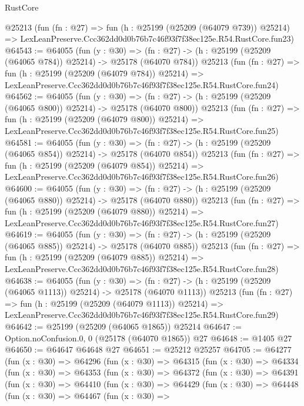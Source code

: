 \begin{lexlean}{RustCore}
\begin{coremodule}
    @25213
    (fun (fn : @27) =>
    fun (h : @25199 (@25209 (@64079 @739)) @25214) =>
    LexLeanPreserve.Ccc362dd0d0b76b7c46f93f7f38ec125e.R54.RustCore.fun23)
@64543 := @64055
    (fun (y : @30) =>
    (fn : @27) -> (h : @25199 (@25209 (@64065 @784)) @25214) -> @25178 (@64070 @784))
    @25213
    (fun (fn : @27) =>
    fun (h : @25199 (@25209 (@64079 @784)) @25214) =>
    LexLeanPreserve.Ccc362dd0d0b76b7c46f93f7f38ec125e.R54.RustCore.fun24)
@64562 := @64055
    (fun (y : @30) =>
    (fn : @27) -> (h : @25199 (@25209 (@64065 @800)) @25214) -> @25178 (@64070 @800))
    @25213
    (fun (fn : @27) =>
    fun (h : @25199 (@25209 (@64079 @800)) @25214) =>
    LexLeanPreserve.Ccc362dd0d0b76b7c46f93f7f38ec125e.R54.RustCore.fun25)
@64581 := @64055
    (fun (y : @30) =>
    (fn : @27) -> (h : @25199 (@25209 (@64065 @854)) @25214) -> @25178 (@64070 @854))
    @25213
    (fun (fn : @27) =>
    fun (h : @25199 (@25209 (@64079 @854)) @25214) =>
    LexLeanPreserve.Ccc362dd0d0b76b7c46f93f7f38ec125e.R54.RustCore.fun26)
@64600 := @64055
    (fun (y : @30) =>
    (fn : @27) -> (h : @25199 (@25209 (@64065 @880)) @25214) -> @25178 (@64070 @880))
    @25213
    (fun (fn : @27) =>
    fun (h : @25199 (@25209 (@64079 @880)) @25214) =>
    LexLeanPreserve.Ccc362dd0d0b76b7c46f93f7f38ec125e.R54.RustCore.fun27)
@64619 := @64055
    (fun (y : @30) =>
    (fn : @27) -> (h : @25199 (@25209 (@64065 @885)) @25214) -> @25178 (@64070 @885))
    @25213
    (fun (fn : @27) =>
    fun (h : @25199 (@25209 (@64079 @885)) @25214) =>
    LexLeanPreserve.Ccc362dd0d0b76b7c46f93f7f38ec125e.R54.RustCore.fun28)
@64638 := @64055
    (fun (y : @30) =>
    (fn : @27) -> (h : @25199 (@25209 (@64065 @1113)) @25214) -> @25178 (@64070 @1113))
    @25213
    (fun (fn : @27) =>
    fun (h : @25199 (@25209 (@64079 @1113)) @25214) =>
    LexLeanPreserve.Ccc362dd0d0b76b7c46f93f7f38ec125e.R54.RustCore.fun29)
@64642 := @25199 (@25209 (@64065 @1865)) @25214
@64647 := Option.noConfusion.{0, 0} (@25178 (@64070 @1865)) @27
@64648 := @1405 @27
@64650 := @64647 @64648 @27
@64651 := @25212 @25257
@64705 := @64277
    (fun (x : @30) =>
    @64296
      (fun (x : @30) =>
      @64315
        (fun (x : @30) =>
        @64334
          (fun (x : @30) =>
          @64353
            (fun (x : @30) =>
            @64372
              (fun (x : @30) =>
              @64391
                (fun (x : @30) =>
                @64410
                  (fun (x : @30) =>
                  @64429
                    (fun (x : @30) =>
                    @64448
                      (fun (x : @30) =>
                      @64467
                        (fun (x : @30) =>

\end{coremodule}
\end{lexlean}
